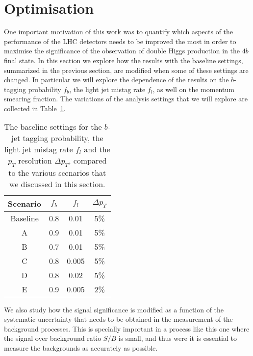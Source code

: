 
\section{Optimisation}
\label{sec:optimisation}

One important motivation of this work was to quantify which aspects
of the performance of the LHC detectors needs to be improved
the most in order to maximise the significance of the observation
of double Higgs production in the $4b$ final state.
%
In this section we explore how the results with the baseline settings,
summarized in the previous section, are modified when some of
these settings are changed.
%
In particular we will explore the dependence of the results on
the $b$-tagging probability $f_b$, the light jet mistag rate
$f_l$, as well on the momentum smearing fraction.
%
The variations of the analysis
settings that we will explore are collected in
Table~\ref{sec:variations}.

\begin{table}[h]
  \centering
  \begin{tabular}{|c|c|c|c|}
\hline
    Scenario  &  $f_b$  &  $f_l$  &  $\Delta p_T$ \\
    \hline
    \hline
    Baseline  &  0.8   &   0.01  &  5\% \\
    \hline
    A        &  0.9   &   0.01  &  5\% \\
    B        &  0.7   &   0.01  &  5\% \\
    C        &  0.8   &   0.005  &  5\% \\
    D        &  0.8   &   0.02  &  5\% \\
    E        &  0.9   &   0.005  &  2\% \\   
    \hline
  \end{tabular}
  \caption{\small The baseline settings for the $b$-jet
    tagging probability, the light jet mistag rate $f_l$
    and the $p_T$ resolution $\Delta p_T$, compared
    to the various scenarios that we discussed in this section.
\label{sec:variations}
  }
  \end{table}

We also study how the signal significance is modified as a function
of the systematic uncertainty that needs to be obtained
in the measurement of the background processes.
%
This is specially important in a process like this one where
the signal over background ratio $S/B$ is small, and thus were
it is essential to measure the backgrounds as accurately
as possible.


